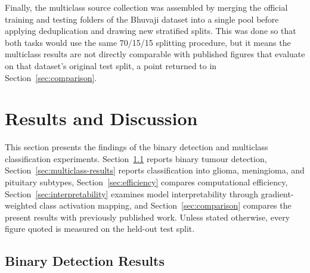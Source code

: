 \documentclass[final,3p,times,number]{elsarticle}
\begin{document}
Finally, the multiclass source collection was assembled by merging the official training and testing folders of the Bhuvaji dataset into a single pool before applying deduplication and drawing new stratified splits. This was done so that both tasks would use the same 70/15/15 splitting procedure, but it means the multiclass results are not directly comparable with published figures that evaluate on that dataset's original test split, a point returned to in Section~\ref{sec:comparison}.

\section{Results and Discussion}
\label{sec:results}

This section presents the findings of the binary detection and multiclass classification experiments. Section~\ref{sec:binary-results} reports binary tumour detection, Section~\ref{sec:multiclass-results} reports classification into glioma, meningioma, and pituitary subtypes, Section~\ref{sec:efficiency} compares computational efficiency, Section~\ref{sec:interpretability} examines model interpretability through gradient-weighted class activation mapping, and Section~\ref{sec:comparison} compares the present results with previously published work. Unless stated otherwise, every figure quoted is measured on the held-out test split.

\subsection{Binary Detection Results}
\label{sec:binary-results}
\end{document}
